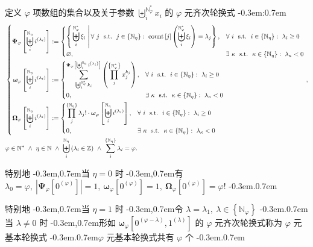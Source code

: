 \documentclass{article}
\newcommand\BrSetN[1]{\Set{\MathPartialSetN{#1}}}
\newcommand\BrSetU[1]{\Set{\MathPartialSetU{#1}}}
\newcommand\InPartialSetN[2]{\InSet{#1}{\BrSetN{#2}}}
\newcommand\InSetN[1]{\InSet{#1}{\MathSetN}}
\newcommand\InSetU[1]{\InSet{#1}{\MathSetU}}
\newcommand\InSetZ[1]{\InSet{#1}{\MathSetZ}}
\newcommand\MathPartialSetN[1]{\mathbb{N}_{#1}}
\newcommand\MathPartialSetU[1]{\mathbb{N}^{\ast}_{#1}}
\newcommand\MathSetN{\mathbb{N}}
\newcommand\MathSetU{\mathbb{N}^{\ast}}
\newcommand\MathSetZ{\mathbb{Z}}
\newcommand\NormalSeqOfU[3]{\SeqOfU{#1}{#2} #3_{#1}}
\newcommand\NormalSumOfN[3]{\SumOfN{#1}{#2} #3_{#1}}
\newcommand\ProdOfN[2]{\prod_{#1}^{\BrSetN{#2}}}
\newcommand\ProdOfU[2]{\prod_{#1}^{\BrSetU{#2}}}
\newcommand\SeqOfNInSetZ[3]{\SeqOfN{#1}{#2} \Bracket{\InSetZ{#3_{#1}}}}
\newcommand\SeqOfN[2]{\Seq{#1}{\MathPartialSetN{#2}}}
\newcommand\SeqOfU[2]{\Seq{#1}{\MathPartialSetU{#2}}}
\newcommand\SumOfN[2]{\sum_{#1}^{\BrSetN{#2}}}
\newcommand\Abs[1]{\left| #1 \right|}
\newcommand\Base[2]{\PowerBracket{0}{#1-#2} \SeqComma \PowerBracket{1}{#2}}
\newcommand\BoldBigOmega[2]{\BracketMidFunc{\Omega}{#1}{#2}}
\newcommand\BoldBigOmegaSeq{\BoldBigOmega{\varphi}{\SeqLambda}}
\newcommand\BoldOmega[2]{\BracketMidFunc{\omega}{#1}{#2}}
\newcommand\BoldOmegaBase[2]{\BoldOmega{#1}{\Base{#1}{#2}}}
\newcommand\BoldOmegaSeq{\BoldOmega{\varphi}{\SeqLambda}}
\newcommand\BoldPsi[2]{\BracketMidFunc{\Psi}{#1}{#2}}
\newcommand\BoldPsiSeq{\BoldPsi{\varphi}{\SeqLambda}}
\newcommand\Bracket[1]{\left( #1 \right)}
\newcommand\BracketBig[1]{\left\{ #1 \right\}}
\newcommand\BracketMid[1]{\left[ #1 \right]}
\newcommand\BracketMidFunc[3]{\bm{#1}_{#2} \BracketMid{#3}}
\newcommand\CaseDomain[1]{\DomainComma & #1}
\newcommand\Colon{:}
\newcommand\Comma{,}
\newcommand\CommaAnd{\Space{\Comma}}
\newcommand\Count{\text{count}}
\newcommand\DefineAs{:=}
\newcommand\DomainAnd{\LogicAnd}
\newcommand\DomainComma{\Comma}
\newcommand\EmptySet{\varnothing}
\newcommand\Exists[3]{\Satisfy{\exists}{#1}{#2}{#3}}
\newcommand\ForAll[3]{\Satisfy{\forall}{#1}{#2}{#3}}
\newcommand\Func[2]{#1 \Bracket{#2}}
\newcommand\InSet[2]{#1 \in #2}
\newcommand\Logic[1]{\ #1\ }
\newcommand\LogicAnd{\Logic{\wedge}}
\newcommand\NumbersSeqLambda{\PowerBracket{i}{\lambda_{i}}}
\newcommand\PowerBracket[2]{#1^{\Bracket{#2}}}
\newcommand\Satisfy[4]{\Space{#1} #2 \SuchThat #3 \Space{\Colon} #4}
\newcommand\Seq[2]{\biguplus_{#1}^{#2}}
\newcommand\SeqComma{\Comma}
\newcommand\SeqLambda{\SeqOfN{i}{\eta} \NumbersSeqLambda}
\newcommand\SeqXi{\NormalSeqOfU{i}{\varphi}{\xi}}
\newcommand\Set[1]{\BracketBig{#1}}
\newcommand\SetDefinition[2]{\Set{\left. #1 \ \right| #2}}
\newcommand\Space[1]{#1\ }
\newcommand\SuchThat{\Logic{\Logic{\text{s.t.}}}}
\newcommand\SumPsiSeq[4]{\sum_{\NormalSeqOfU{#1}{#2}{#3}}^{\BoldPsi{#2}{#4}}}
\newcommand\ZeroSeq[1]{\PowerBracket{0}{#1}}
\newcommand\EqEndPeriod{.}
\newcommand\TextColon{\TextPunctuation{\Colon}}
\newcommand\TextComma{\TextPunctuation{\Comma}}
\newcommand\TextPeriod{\TextPunctuation{.}}
\newcommand\TextPunctuation[1]{\kern -0.3em#1\kern 0.7em}
\begin{document}
	定义 $\varphi$ 项数组的集合以及关于参数 $\NormalSeqOfU{i}{\varphi}{x}$ 的 $\varphi$ 元齐次轮换式 \TextColon
	\begin{align*}
	& \left\{ \begin{aligned}
	\BoldPsiSeq & \DefineAs
	\begin{dcases}
	\SetDefinition{\SeqXi}{\ForAll{j}{\InPartialSetN{j}{\eta}}{\Func{\Count \BracketMid{j}}{\SeqXi} = \lambda_{j}}} \CaseDomain{\ForAll{i}{\InPartialSetN{i}{\eta}}{\lambda_{i} \geq 0}} \\
	\EmptySet \CaseDomain{\Exists{\kappa}{\InPartialSetN{\kappa}{\eta}}{\lambda_{\kappa} < 0}}
	\end{dcases} \\
	\BoldOmegaSeq & \DefineAs
	\begin{dcases}
	\SumPsiSeq{i}{\varphi}{k}{\SeqLambda} \Bracket{\ProdOfU{j}{\varphi} x_{j}^{k_{j}}} \CaseDomain{\ForAll{i}{\InPartialSetN{i}{\eta}}{\lambda_{i} \geq 0}} \\
	0 \CaseDomain{\Exists{\kappa}{\InPartialSetN{\kappa}{\eta}}{\lambda_{\kappa} < 0}}
	\end{dcases} \\
	\BoldBigOmegaSeq & \DefineAs
	\begin{dcases}
	\ProdOfN{j}{\eta} \lambda_{j}! \cdot \BoldOmegaSeq \CaseDomain{\ForAll{i}{\InPartialSetN{i}{\eta}}{\lambda_{i} \geq 0}} \\
	0 \CaseDomain{\Exists{\kappa}{\InPartialSetN{\kappa}{\eta}}{\lambda_{\kappa} < 0}}
	\end{dcases}
	\end{aligned} \right. \DomainComma \\
	& \InSetU{\varphi} \DomainAnd \InSetN{\eta} \DomainAnd \SeqOfNInSetZ{i}{\eta}{\lambda} \DomainAnd \NormalSumOfN{i}{\eta}{\lambda} = \varphi \EqEndPeriod
	\end{align*}
	
	特别地 \TextComma 当 $\eta = 0$ 时 \TextComma 有 $\lambda_{0} = \varphi \CommaAnd \Abs{\BoldPsi{\varphi}{\ZeroSeq{\varphi}}} = 1 \CommaAnd \BoldOmega{\varphi}{\ZeroSeq{\varphi}} = 1 \CommaAnd \BoldBigOmega{\varphi}{\ZeroSeq{\varphi}} = \varphi!$ \TextPeriod
	
	特别地 \TextComma 当 $\eta = 1$ 时 \TextComma 令 $\lambda = \lambda_{1} \CommaAnd \InPartialSetN{\lambda}{\varphi}$ \TextPeriod 当 $\lambda \neq 0$ 时 \TextComma 形如 $\BoldOmegaBase{\varphi}{\lambda}$ 的 $\varphi$ 元齐次轮换式称为 $\varphi$ 元基本轮换式 \TextPeriod $\varphi$ 元基本轮换式共有 $\varphi$ 个 \TextPeriod
	
\end{document}
